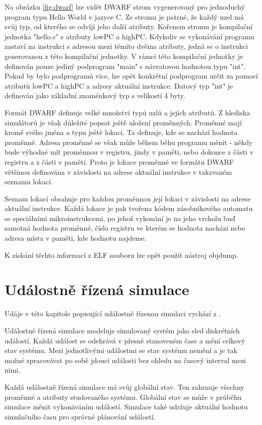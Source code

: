 Na obrázku \ref{fig:dwarf} lze vidět DWARF strom vygenerovaný pro jednoduchý program typu Hello World v jazyce C. Ze stromu je patrné, že každý uzel má svůj typ, od kterého se odvíjí jeho další atributy. Kořenem stromu je kompilační jednotka "hello.c" s atributy lowPC a highPC. Kdykoliv se vykonávání programu zastaví na instrukci s adresou mezi těmito dvěma atributy, jedná se o instrukci generovanou z této kompilační jednotky. V rámci této kompilační jednotky je definován pouze jediný podprogram "main" s návratovou hodnotou typu "int". Pokud by bylo podprogramů více, lze opět konkrétní podprogram určit za pomocí atributů lowPC a highPC a adresy aktuální instrukce. Datový typ "int" je definován jako základní znaménkový typ s velikostí 4 byty.

Formát DWARF definuje velké množství typů uzlů a jejich atributů. Z hlediska simulátorů je však důležité popsat ještě uložení proměnných. Proměnné mají kromě svého jména a typu ještě lokaci. Ta definuje, kde se nachází hodnota proměnné. Adresa proměnné se však může během běhu programu měnit - někdy bude výhodné mít proměnnou v registru, jindy v paměti, nebo dokonce z části v registru a z části v paměti. Proto je lokace proměnné ve formátu DWARF většinou definována v závislosti na adrese aktuální instrukce v takzvaném seznamu lokací.

Seznam lokací obsahuje pro každou proměnnou její lokaci v závislosti na adrese aktuální instrukce. Každá lokace je pak tvořena kódem zásobníkového automatu se speciálními mikroinstrukcemi, po jehož vykonání je na jeho vrcholu buď samotná hodnota proměnné, číslo registru ve kterém se hodnota nachází nebo
adresa místa v paměti, kde hodnotu najdeme.

K získání těchto informací z ELF souboru lze opět použít nástroj objdump.

\chapter{Událostně řízená simulace}

Udáje v této kapitole popisující událostně řízenou simulaci vychází z \cite{nutaro}.

Událostně řízená simulace modeluje simulovaný systém jako sled diskrétních událostí. Každá událost se odehrává v přesně stanoveném čase a mění celkový
stav systému. Mezi jednotlivými událostmi se stav systému nemění a je tak možné zpracovávat po sobě jdoucí události bez ohledu na časový interval
mezi nimi.

Každá událostně řízená simulace má svůj globální stav. Ten zahrnuje všechny proměnné a atributy studovaného systému. Globální stav se může v průběhu
simulace měnit vykonáváním událostí. Simulace také udržuje aktuální hodnotu simulačního času pro správné plánování událostí.

